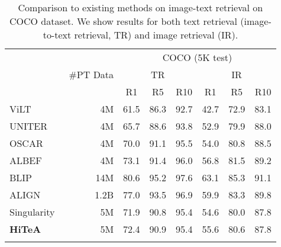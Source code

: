 \documentclass[10pt,twocolumn,letterpaper]{article}
\newlength\savewidth
\newcommand\shline{\noalign{\global\savewidth\arrayrulewidth\global\arrayrulewidth 1pt}\hline\noalign{\global\arrayrulewidth\savewidth}}
\newcommand{\tablestyle}[2]{\setlength{\tabcolsep}{#1}\renewcommand{\arraystretch}{#2}\centering\small}
\newcommand{\modelname}{\textbf{HiTeA}\xspace}
\begin{document}
\begin{table}[t]
\vspace{1em}
\tablestyle{3.5pt}{1.05}
\begin{tabular}{lrcccccc}
\shline
\multirow{3}{*}{ Method } & \multirow{3}{*}{ \#PT Data} & \multicolumn{6}{c}{COCO (5K test)} \\
& & \multicolumn{3}{c}{TR} & \multicolumn{3}{c}{IR } \\
\cmidrule(lr){3-5} \cmidrule(lr){6-8}
& & R1 & R5 & R10 & R1 & R5 & R10 \\
\midrule
ViLT~\cite{kim2021vilt} & 4M & 61.5 & 86.3 & 92.7 & 42.7 & 72.9 & 83.1 \\
UNITER~\cite{chen2020uniter} & 4M & 65.7 & 88.6 & 93.8 & 52.9 & 79.9 & 88.0 \\
OSCAR~\cite{li2020oscar} & 4M & 70.0 & 91.1 & 95.5 & 54.0 & 80.8 & 88.5 \\
ALBEF~\cite{li2021align} & 4M & 73.1 & 91.4 & 96.0 & 56.8 & 81.5 & 89.2 \\
BLIP~\cite{li2022blip} & 14M & 80.6 & 95.2 & 97.6 & 63.1 & 85.3 & 91.1 \\
ALIGN~\cite{jia2021scaling} & 1.2B & 77.0 & 93.5 & 96.9 & 59.9 & 83.3 & 89.8 \\
Singularity~\cite{lei2022singularity} & 5M & 71.9 & 90.8 & 95.4 & 54.6 & 80.0 & 87.8 \\
\hline
\modelname & 5M & 72.4 & 90.9 & 95.4 & 55.6 & 80.6 & 87.8 \\
\shline
\end{tabular}
\caption{Comparison to existing methods on image-text retrieval on COCO dataset. We show results for both text retrieval (image-to-text retrieval, TR) and image retrieval (IR).}
\label{tab:img_ret_coco}
\end{table}
%
\end{document}
